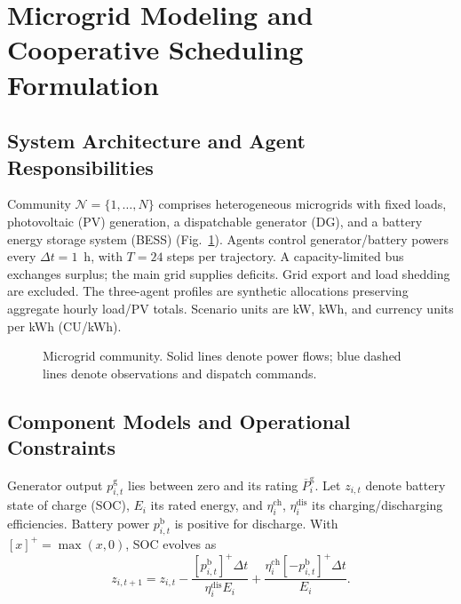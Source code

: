 \section{Microgrid Modeling and Cooperative Scheduling Formulation}
\label{sec:formulation}

\subsection{System Architecture and Agent Responsibilities}
\label{sec:architecture}

Community $\mathcal{N}=\{1,\ldots,N\}$ comprises heterogeneous microgrids
with fixed loads, photovoltaic (PV) generation, a dispatchable generator (DG),
and a battery energy storage system (BESS) (Fig.~\ref{fig:community-architecture}).
Agents control generator/battery powers every $\Delta t=1$~h,
with $T=24$ steps per trajectory. A capacity-limited bus exchanges surplus;
the main grid supplies deficits. Grid export and load shedding are excluded.
The three-agent profiles are synthetic allocations preserving aggregate
hourly load/PV totals.
Scenario units are kW, kWh, and currency units per kWh (CU/kWh).

\begin{figure}[htbp]
 \centering
 \resizebox{\linewidth}{!}{}
 \caption{Microgrid community. Solid lines denote power flows; blue dashed
 lines denote observations and dispatch commands.}
 \label{fig:community-architecture}
\end{figure}

\subsection{Component Models and Operational Constraints}
\label{sec:components}

Generator output $p_{i,t}^{\mathrm{g}}$ lies between zero and its rating
$\overline{P}_i^{\mathrm{g}}$. Let $z_{i,t}$ denote battery state of charge
(SOC), $E_i$ its rated energy, and $\eta_i^{\mathrm{ch}}$,
$\eta_i^{\mathrm{dis}}$ its charging/discharging efficiencies.
Battery power $p_{i,t}^{\mathrm{b}}$ is positive for discharge.
With $[x]^+=\max(x,0)$, SOC evolves as
\begin{equation}
 z_{i,t+1}=z_{i,t}
 -\frac{[p_{i,t}^{\mathrm{b}}]^+\Delta t}{\eta_i^{\mathrm{dis}}E_i}
 +\frac{\eta_i^{\mathrm{ch}}[-p_{i,t}^{\mathrm{b}}]^+\Delta t}{E_i}.
 \label{eq:soc-transition}
\end{equation}

